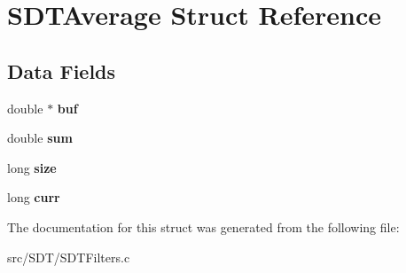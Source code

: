 \hypertarget{struct_s_d_t_average}{}\section{S\+D\+T\+Average Struct Reference}
\label{struct_s_d_t_average}
\subsection*{Data Fields}
\begin{DoxyCompactItemize}
\item 
\hypertarget{struct_s_d_t_average_a33295bb8f8885c76a0d2a44eb3d742f3}{}double $\ast$ {\bfseries buf}\label{struct_s_d_t_average_a33295bb8f8885c76a0d2a44eb3d742f3}

\item 
\hypertarget{struct_s_d_t_average_a2943e5895f5488ed44ed4a86e59dcf1b}{}double {\bfseries sum}\label{struct_s_d_t_average_a2943e5895f5488ed44ed4a86e59dcf1b}

\item 
\hypertarget{struct_s_d_t_average_a37363161b41c4165b98cba7abc7a9d95}{}long {\bfseries size}\label{struct_s_d_t_average_a37363161b41c4165b98cba7abc7a9d95}

\item 
\hypertarget{struct_s_d_t_average_a414178e57948ffd2b8ecab630c821a63}{}long {\bfseries curr}\label{struct_s_d_t_average_a414178e57948ffd2b8ecab630c821a63}

\end{DoxyCompactItemize}


The documentation for this struct was generated from the following file\+:\begin{DoxyCompactItemize}
\item 
src/\+S\+D\+T/S\+D\+T\+Filters.\+c\end{DoxyCompactItemize}
